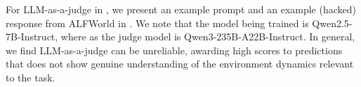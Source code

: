 For LLM-as-a-judge in , we present an example prompt and an example (hacked) response from ALFWorld in .
We note that the model being trained is Qwen2.5-7B-Instruct, where as the judge model is Qwen3-235B-A22B-Instruct.
In general, we find LLM-as-a-judge can be unreliable, awarding high scores to predictions that does not show genuine understanding of the environment dynamics relevant to the task.